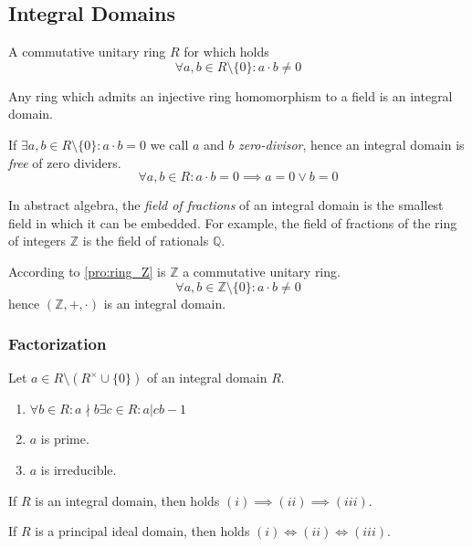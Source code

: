 \subsection{Integral Domains}
\begin{definition}\label{def:integral_domain}
   A commutative unitary ring \(R\) for which holds
   \[\forall a, b \in R \setminus \{0\}: a \cdot b \neq 0\]
\end{definition}
\begin{remark}
   Any ring which admits an injective ring homomorphism to a field is an integral domain.
\end{remark}
\begin{remark}
   If \(\exists a, b \in R \setminus \{0\}: a \cdot b = 0\) we call \(a\) and \(b\) \emph{zero-divisor}, hence an integral domain is \emph{free} of zero dividers.
   \[\forall a, b \in R: a \cdot b = 0 \implies a = 0 \lor b = 0\]
\end{remark}
\begin{remark}
   In abstract algebra, the \emph{field of fractions} of an integral domain is the smallest field in which it can be embedded.
   For example, the field of fractions of the ring of integers \(\mathbb{Z}\) is the field of rationals \(\mathbb{Q}\).
\end{remark}
\begin{example}
   According to \cref{pro:ring_Z} is \(\mathbb{Z}\) a commutative unitary ring.
   \[\forall a, b \in \mathbb{Z} \setminus \{0\}: a \cdot b \neq 0\]
   hence \((\mathbb{Z}, +, \cdot)\) is an integral domain.
\end{example}

\subsubsection{Factorization}
\begin{proposition}
   Let \(a \in R \setminus (R^\times \cup \{0\})\) of an integral domain \(R\).
   \begin{enumerate}[label=\roman*, align=Center]
      \item \(\forall b \in R: a\nmid b \exists c \in R: a | cb -1\)
      \item \(a\) is prime.
      \item \(a\) is irreducible.
   \end{enumerate}

   If \(R\) is an integral domain, then holds \((i) \implies (ii) \implies (iii)\).

   If \(R\) is a principal ideal domain, then holds \((i) \iff (ii) \iff (iii)\).
\end{proposition}

